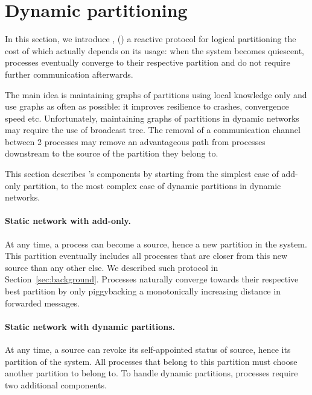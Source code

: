
\section{Dynamic partitioning}
\label{sec:proposal}

In this section, we introduce \NAME, () a reactive
protocol for logical partitioning the cost of which actually depends
on its usage: when the system becomes quiescent, processes eventually
converge to their respective partition and do not require further
communication afterwards.

The main idea is maintaining graphs of partitions using local
knowledge only and use graphs as often as possible: it improves
resilience to crashes, convergence speed etc. Unfortunately,
maintaining graphs of partitions in dynamic networks may require the
use of broadcast tree. The removal of a communication channel between
2 processes may remove an advantageous path from processes downstream
to the source of the partition they belong to.

This section describes \NAME's components by starting from the
simplest case of add-only partition, to the most complex case of
dynamic partitions in dynamic networks. 


\paragraph{Static network with add-only.}
At any time, a process can become a source, hence  a
new partition in the system. This partition eventually includes all
processes that are closer from this new source than any other else. We
described such protocol in Section~\ref{sec:background}. Processes
naturally converge towards their respective best partition by only
piggybacking a monotonically increasing distance in forwarded
messages.  

\paragraph{Static network with dynamic partitions.}
At any time, a source can revoke its self-appointed status of source,
hence  its partition of the system. All processes that
belong to this partition must choose another partition to belong to.
To handle dynamic partitions, processes require two additional
components.

